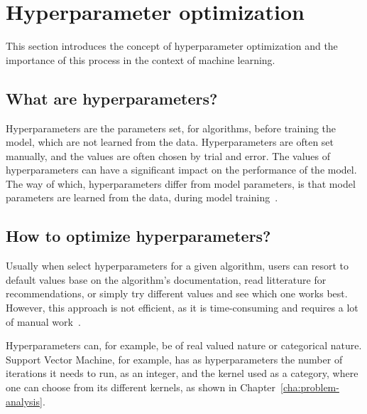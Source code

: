 \section{Hyperparameter optimization}\label{sec:hyperparam}
This section introduces the concept of hyperparameter optimization and the importance of this process in the context of machine learning. 


\subsection{What are hyperparameters?}\label{subsec:hyperparam-what}
Hyperparameters are the parameters set, for algorithms, before training the model, which are not learned from the data. Hyperparameters are often set manually, and the values are often chosen by trial and error. The values of hyperparameters can have a significant impact on the performance of the model. The way of which, hyperparameters differ from model parameters, is that model parameters are learned from the data, during model training~\cite{probst2019tunability}.


\subsection{How to optimize hyperparameters?}\label{subsec:hyperparam-how}
 Usually when select hyperparameters for a given algorithm, users can resort to default values base on the algorithm's documentation, read litterature for recommendations, or simply try different values and see which one works best. However, this approach is not efficient, as it is time-consuming and requires a lot of manual work~\cite{probst2019tunability}.

Hyperparameters can, for example, be of real valued nature or categorical nature. Support Vector Machine, for example, has as hyperparameters the number of iterations it needs to run, as an integer, and the kernel used as a category, where one can choose from its different kernels, as shown in Chapter~\ref{cha:problem-analysis}.


